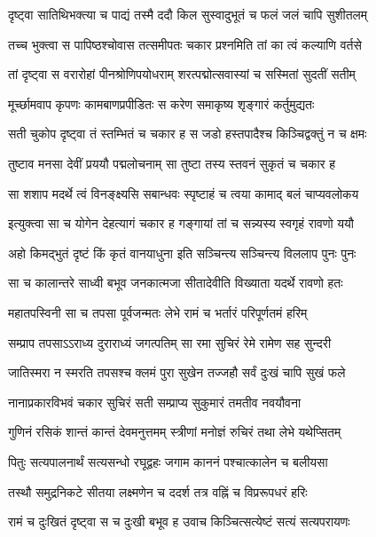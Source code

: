 \twolineshloka
{दृष्ट्वा सातिथिभक्त्या च पाद्यं तस्मै ददौ किल}
{सुस्वादुभूतं च फलं जलं चापि सुशीतलम्} %

\twolineshloka
{तच्च भुक्त्वा स पापिष्ठश्चोवास तत्समीपतः}
{चकार प्रश्नमिति तां का त्वं कल्याणि वर्तसे} %

\twolineshloka
{तां दृष्ट्वा स वरारोहां पीनश्रोणिपयोधराम्}
{शरत्पद्मोत्सवास्यां च सस्मितां सुदतीं सतीम्} %

\twolineshloka
{मूर्च्छामवाप कृपणः कामबाणप्रपीडितः}
{स करेण समाकृष्य शृङ्‌गारं कर्तुमुद्यतः} %

\twolineshloka
{सती चुकोप दृष्ट्वा तं स्तम्भितं च चकार ह}
{स जडो हस्तपादैश्च किञ्चिद्वक्तुं न च क्षमः} %

\twolineshloka
{तुष्टाव मनसा देवीं प्रययौ पद्मलोचनाम्}
{सा तुष्टा तस्य स्तवनं सुकृतं च चकार ह} %

\twolineshloka
{सा शशाप मदर्थे त्वं विनङ्क्ष्यसि सबान्धवः}
{स्पृष्टाहं च त्वया कामाद्‌ बलं चाप्यवलोकय} %

\twolineshloka
{इत्युक्त्वा सा च योगेन देहत्यागं चकार ह}
{गङ्‌गायां तां च सन्न्यस्य स्वगृहं रावणो ययौ} %

\twolineshloka
{अहो किमद्‍भुतं दृष्टं किं कृतं वानयाधुना}
{इति सञ्चिन्त्य सञ्चिन्त्य विललाप पुनः पुनः} %

\twolineshloka
{सा च कालान्तरे साध्वी बभूव जनकात्मजा}
{सीतादेवीति विख्याता यदर्थे रावणो हतः} %

\twolineshloka
{महातपस्विनी सा च तपसा पूर्वजन्मतः}
{लेभे रामं च भर्तारं परिपूर्णतमं हरिम्} %

\twolineshloka
{सम्प्राप तपसाऽऽराध्य दुराराध्यं जगत्पतिम्}
{सा रमा सुचिरं रेमे रामेण सह सुन्दरी} %

\twolineshloka
{जातिस्मरा न स्मरति तपसश्च क्लमं पुरा}
{सुखेन तज्जहौ सर्वं दुःखं चापि सुखं फले} %

\twolineshloka
{नानाप्रकारविभवं चकार सुचिरं सती}
{सम्प्राप्य सुकुमारं तमतीव नवयौवना} %

\twolineshloka
{गुणिनं रसिकं शान्तं कान्तं देवमनुत्तमम्}
{स्त्रीणां मनोज्ञं रुचिरं तथा लेभे यथेप्सितम्} %

\twolineshloka
{पितुः सत्यपालनार्थं सत्यसन्धो रघूद्वहः}
{जगाम काननं पश्चात्कालेन च बलीयसा} %

\twolineshloka
{तस्थौ समुद्रनिकटे सीतया लक्ष्मणेन च}
{ददर्श तत्र वह्निं च विप्ररूपधरं हरिः} %

\twolineshloka
{रामं च दुःखितं दृष्ट्वा स च दुःखी बभूव ह}
{उवाच किञ्चित्सत्येष्टं सत्यं सत्यपरायणः} %


